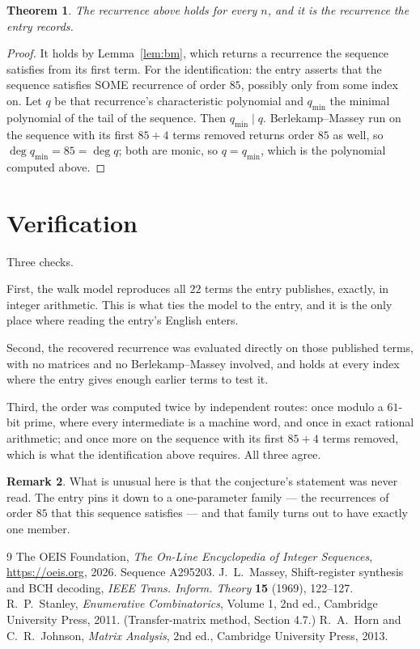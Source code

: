 \documentclass[11pt,a4paper]{article}
\theoremstyle{plain}
\newtheorem{theorem}{Theorem}
\theoremstyle{definition}
\newtheorem{remark}[theorem]{Remark}
\begin{document}
\begin{theorem}
The recurrence above holds for every $n$, and it is the recurrence the entry records.
\end{theorem}

\begin{proof}
It holds by Lemma~\ref{lem:bm}, which returns a recurrence the sequence satisfies from its
first term. For the identification: the entry asserts that the sequence satisfies SOME
recurrence of order $85$, possibly only from some index on. Let $q$ be that recurrence's
characteristic polynomial and $q_{\min}$ the minimal polynomial of the tail of the sequence.
Then $q_{\min}\mid q$. Berlekamp--Massey run on the sequence with its first $85+4$ terms
removed returns order $85$ as well, so $\deg q_{\min}=85=\deg q$; both are monic, so
$q=q_{\min}$, which is the polynomial computed above.
\end{proof}

\section{Verification}

Three checks.

First, the walk model reproduces all $22$ terms the entry publishes, exactly, in integer
arithmetic. This is what ties the model to the entry, and it is the only place where reading
the entry's English enters.

Second, the recovered recurrence was evaluated directly on those published terms, with no
matrices and no Berlekamp--Massey involved, and holds at every index where the entry gives
enough earlier terms to test it.

Third, the order was computed twice by independent routes: once modulo a $61$-bit prime, where
every intermediate is a machine word, and once in exact rational arithmetic; and once more on
the sequence with its first $85+4$ terms removed, which is what the identification above
requires. All three agree.

\begin{remark}
What is unusual here is that the conjecture's statement was never read. The entry pins it down
to a one-parameter family --- the recurrences of order $85$ that this sequence satisfies
--- and that family turns out to have exactly one member.
\end{remark}

\begin{thebibliography}{9}
 The OEIS Foundation, \emph{The On-Line Encyclopedia of Integer
Sequences}, \url{https://oeis.org}, 2026. Sequence A295203.
 J.~L.~Massey, Shift-register synthesis and BCH decoding, \emph{IEEE
Trans. Inform. Theory} \textbf{15} (1969), 122--127.
 R.~P.~Stanley, \emph{Enumerative Combinatorics}, Volume 1, 2nd ed.,
Cambridge University Press, 2011. (Transfer-matrix method, Section 4.7.)
 R.~A.~Horn and C.~R.~Johnson, \emph{Matrix Analysis}, 2nd ed., Cambridge
University Press, 2013.
\end{thebibliography}
\end{document}
